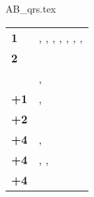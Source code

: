 

{AB_qrs.tex}

\vspace*{20pt}

\centeredsubtitle{\reanimated}

{\normalfontsize\renewcommand{\arraystretch}{1.5}%
\begin{center}\begin{tabular}{M{0.9cm}m{11cm}}%
\toprule%
\textbf{1} & \characters{}, \courtofthedamned{}, \altarofundeath{}, \darkcoach{}, \modelsofthesuffering{}, \shriekinghorror{}, \vampireknights{}, \varkolak{}\tabularnewline
\textbf{2} & \cadaverwagon{}\tabularnewline
\textbf{\Dthree{}} & \wingedreapers{}, \vampirespawn{}\tabularnewline
\textbf{\Dthree{}+1} & \ghasts{}, \greatbats{}\tabularnewline
\textbf{\Dthree{}+2} & \barrowknights{}\tabularnewline
\textbf{\Dthree{}+4} & \direwolves{}, \barrowguard{}\tabularnewline
\textbf{\Dsix{}+4} & \skeletons{}, \ghouls{}, \batswarms{}\tabularnewline
\textbf{+4} & \zombies{}\tabularnewline
\bottomrule
\end{tabular}\end{center}
}


\debugfooter

